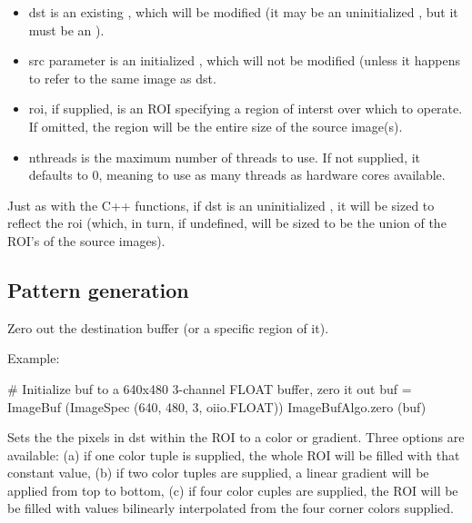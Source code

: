 \begin{itemize}
\item {\cf dst} is an existing \ImageBuf, which will be modified (it may be
an uninitialized \ImageBuf, but it must be an \ImageBuf).
\item {\cf src} parameter is an initialized \ImageBuf, which will not be
modified (unless it happens to refer to the same image as {\cf dst}.
\item {\cf roi}, if supplied, is an {\cf ROI} specifying a region of interst
over which to operate. If omitted, the region will be the entire size of the
source image(s).
\item {\cf nthreads} is the maximum number of threads to use. If not
supplied, it defaults to 0, meaning to use as many threads as hardware cores
available.
\end{itemize}

Just as with the C++ \IBA functions, if {\cf dst} is an uninitialized
\ImageBuf, it will be sized to reflect the {\cf roi} (which, in turn, if
undefined, will be sized to be the union of the ROI's of the source 
images).

\subsection{Pattern generation}
\label{sec:iba:py:patterns}

 

Zero out the destination buffer (or a specific region of it).

\smallskip
\noindent Example:
\begin{code}
    # Initialize buf to a 640x480 3-channel FLOAT buffer, zero it out
    buf = ImageBuf (ImageSpec (640, 480, 3, oiio.FLOAT))
    ImageBufAlgo.zero (buf)
\end{code}
\apiend

 

Sets the the pixels in {\cf dst} within the ROI to a color or gradient.
Three options are available: (a) if one color tuple is supplied, the whole
ROI will be filled with that constant value, (b) if two color tuples are
supplied, a linear gradient will be applied from top to bottom, (c) if
four color cuples are supplied, the ROI will be be filled with values
bilinearly interpolated from the four corner colors supplied.

